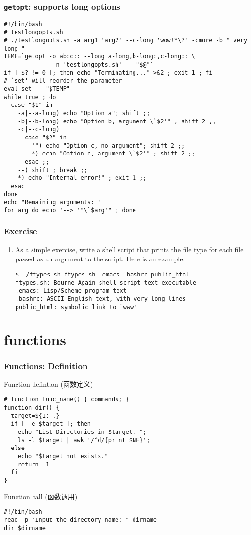 \documentclass[red]{beamer}
\begin{document}
\begin{CJK*}{UTF8}{gbsn}
\begin{frame}
\frametitle{\texttt{getopt}: supports long options}
\begin{lstlisting}
#!/bin/bash
# testlongopts.sh
# ./testlongopts.sh -a arg1 'arg2' --c-long 'wow!*\?' -cmore -b " very long "
TEMP=`getopt -o ab:c:: --long a-long,b-long:,c-long:: \
              -n 'testlongopts.sh' -- "$@"`
if [ $? != 0 ]; then echo "Terminating..." >&2 ; exit 1 ; fi
# `set' will reorder the parameter  
eval set -- "$TEMP"
while true ; do
  case "$1" in
    -a|--a-long) echo "Option a"; shift ;;
    -b|--b-long) echo "Option b, argument \`$2'" ; shift 2 ;;
    -c|--c-long)
      case "$2" in 
        "") echo "Option c, no argument"; shift 2 ;;
        *) echo "Option c, argument \`$2'" ; shift 2 ;;
      esac ;;
    --) shift ; break ;;
    *) echo "Internal error!" ; exit 1 ;;
  esac
done
echo "Remaining arguments: "
for arg do echo '--> '"\`$arg'" ; done
\end{lstlisting}
\end{frame}


\begin{frame}
\frametitle{Exercise}
\begin{enumerate}
	\item As a simple exercise, write a shell script that 
prints the file type for each file passed as an 
argument to the script. Here is an example:
\begin{lstlisting}[basicstyle=\footnotesize\ttfamily]
$ ./ftypes.sh ftypes.sh .emacs .bashrc public_html
ftypes.sh: Bourne-Again shell script text executable
.emacs: Lisp/Scheme program text
.bashrc: ASCII English text, with very long lines
public_html: symbolic link to `www'
\end{lstlisting}
\end{enumerate}
\end{frame}

\section{functions}

\begin{frame}
\frametitle{Functions: Definition}
\begin{block}{\centering Function defintion (函数定义)}
\begin{lstlisting}
# function func_name() { commands; }
function dir() {
  target=${1:-.}
  if [ -e $target ]; then
    echo "List Directories in $target: ";
    ls -l $target | awk '/^d/{print $NF}';
  else
    echo "$target not exists."
    return -1
  fi
}
\end{lstlisting}
\end{block}
\begin{block}{\centering Function call (函数调用)}
\begin{lstlisting}
#!/bin/bash
read -p "Input the directory name: " dirname
dir $dirname
\end{lstlisting}
\end{block}
\end{frame}



\end{CJK*}
\end{document}
